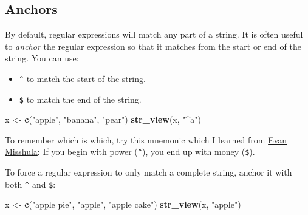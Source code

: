 \documentclass[
]{book}
\newenvironment{Shaded}{\begin{snugshade}}{\end{snugshade}}
\newcommand{\KeywordTok}[1]{\textcolor[rgb]{0.13,0.29,0.53}{\textbf{#1}}}
\newcommand{\NormalTok}[1]{#1}
\newcommand{\StringTok}[1]{\textcolor[rgb]{0.31,0.60,0.02}{#1}}
\providecommand{\tightlist}{%
  \setlength{\itemsep}{0pt}\setlength{\parskip}{0pt}}
\begin{document}
\hypertarget{anchors}{%
\subsection{Anchors}\label{anchors}}

By default, regular expressions will match any part of a string. It is often useful to \emph{anchor} the regular expression so that it matches from the start or end of the string. You can use:

\begin{itemize}
\tightlist
\item
  \texttt{\^{}} to match the start of the string.
\item
  \texttt{\$} to match the end of the string.
\end{itemize}

\begin{Shaded}
\begin{Highlighting}[]
\NormalTok{x <-}\StringTok{ }\KeywordTok{c}\NormalTok{(}\StringTok{"apple"}\NormalTok{, }\StringTok{"banana"}\NormalTok{, }\StringTok{"pear"}\NormalTok{)}
\KeywordTok{str_view}\NormalTok{(x, }\StringTok{"^a"}\NormalTok{)}
\end{Highlighting}
\end{Shaded}

\hypertarget{htmlwidget-36aa3d2a04d42bbc2145}{}

\begin{Shaded}
\end{Shaded}

\hypertarget{htmlwidget-febe03efa1a2d8d52a86}{}

To remember which is which, try this mnemonic which I learned from \href{https://twitter.com/emisshula/status/323863393167613953}{Evan Misshula}: If you begin with power (\texttt{\^{}}), you end up with money (\texttt{\$}).

To force a regular expression to only match a complete string, anchor it with both \texttt{\^{}} and \texttt{\$}:

\begin{Shaded}
\begin{Highlighting}[]
\NormalTok{x <-}\StringTok{ }\KeywordTok{c}\NormalTok{(}\StringTok{"apple pie"}\NormalTok{, }\StringTok{"apple"}\NormalTok{, }\StringTok{"apple cake"}\NormalTok{)}
\KeywordTok{str_view}\NormalTok{(x, }\StringTok{"apple"}\NormalTok{)}
\end{Highlighting}
\end{Shaded}
\end{document}
